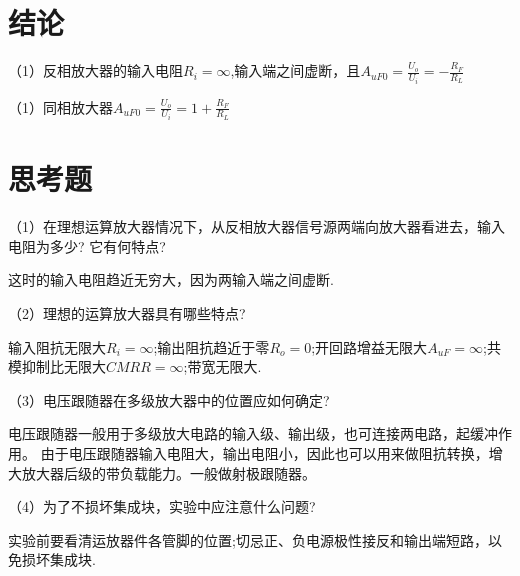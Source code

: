 \documentclass{article}
\begin{document}
\section{结论}
（1）反相放大器的输入电阻$R_i=\infty$,输入端之间虚断，且$ A_{uF0}=\frac{U_o}{U_i}=-\frac{R_F}{R_L}$\par
（1）同相放大器$ A_{uF0}=\frac{U_o}{U_i}=1+\frac{R_F}{R_L}$

\section{思考题}
（1）在理想运算放大器情况下，从反相放大器信号源两端向放大器看进去，输入电阻为多少? 它有何特点?\par
这时的输入电阻趋近无穷大，因为两输入端之间虚断.\par
（2）理想的运算放大器具有哪些特点?\par
输入阻抗无限大$R_i=\infty$;输出阻抗趋近于零$R_o=0$;开回路增益无限大$A_{uF}=\infty$;共模抑制比无限大$CMRR=\infty$;带宽无限大.\par
（3）电压跟随器在多级放大器中的位置应如何确定?\par
电压跟随器一般用于多级放大电路的输入级、输出级，也可连接两电路，起缓冲作用。
由于电压跟随器输入电阻大，输出电阻小，因此也可以用来做阻抗转换，增大放大器后级的带负载能力。一般做射极跟随器。 \par
（4）为了不损坏集成块，实验中应注意什么问题?\par
实验前要看清运放器件各管脚的位置;切忌正、负电源极性接反和输出端短路，以免损坏集成块.
\end{document}
